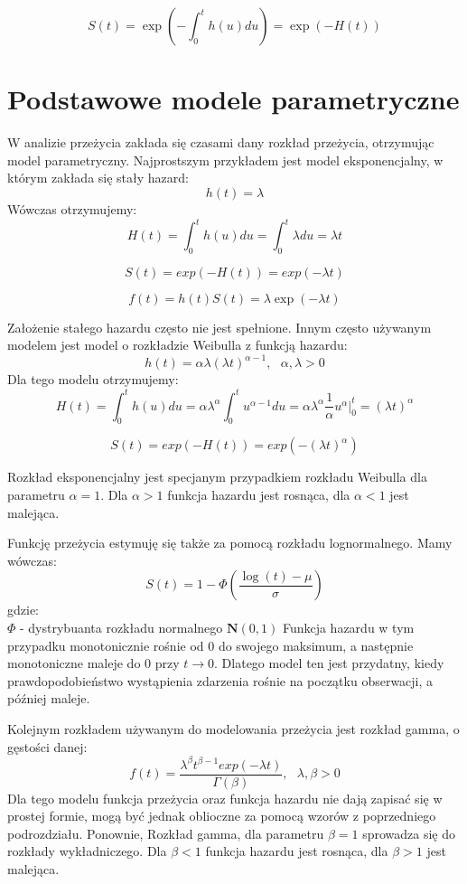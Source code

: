 \documentclass[]{pracamgr}
\begin{document}
\begin{equation}
S(t) = \exp(-\int_0^t h(u)du) = \exp(-H(t))
\end{equation}

\section{Podstawowe modele parametryczne}
W analizie przeżycia zakłada się czasami dany rozkład przeżycia, otrzymując model parametryczny. Najprostszym przykładem jest model eksponencjalny, w którym zakłada się stały hazard:
\begin{equation}\label{exp_hazard}
h(t) = \lambda
\end{equation}
Wówczas otrzymujemy:
$$H(t) = \int_0^t h(u)du = \int_0^t \lambda du = \lambda t $$

$$S(t) = exp(-H(t)) = exp(-\lambda t)$$

$$f(t) = h(t)S(t) = \lambda \exp(-\lambda t) $$

Założenie stałego hazardu często nie jest spełnione. Innym często używanym modelem jest model o rozkładzie Weibulla z funkcją hazardu:
\begin{equation}\label{weibull_haz}
h(t) = \alpha \lambda (\lambda t)^{\alpha -1}, \ \ \ \alpha, \lambda > 0
\end{equation}
Dla tego modelu otrzymujemy:
$$H(t) = \int_0^t h(u)du = \alpha \lambda^\alpha \int_0^t u^{\alpha - 1}du = \alpha \lambda^\alpha \frac{1}{\alpha} u^{\alpha}|_0^t = (\lambda t)^\alpha $$

$$S(t) = exp(-H(t)) = exp(-(\lambda t)^\alpha)$$

Rozkład eksponencjalny jest specjanym przypadkiem rozkładu Weibulla dla parametru $\alpha=1$. Dla $\alpha >1$ funkcja hazardu jest rosnąca, dla $\alpha <1$ jest malejąca.

Funkcję przeżycia estymuję się także za pomocą rozkładu lognormalnego. Mamy wówczas:
\begin{equation}\label{lognorm}
S(t) = 1 - \Phi (\frac{\log(t)-\mu}{\sigma})
\end{equation}
gdzie: \\
$\Phi$ - dystrybuanta rozkładu normalnego $\mathbf{N}(0,1)$
Funkcja hazardu w tym przypadku monotonicznie rośnie od $0$ do swojego maksimum, a następnie monotoniczne maleje do $0$ przy $t \to 0$. Dlatego model ten jest przydatny, kiedy prawdopodobieństwo wystąpienia zdarzenia rośnie na początku obserwacji, a później maleje.

Kolejnym rozkładem używanym do modelowania przeżycia jest rozkład gamma, o gęstości danej:
\begin{equation}\label{gamma}
f(t) = \frac{\lambda^\beta t^{\beta - 1} exp(-\lambda t)}{\Gamma(\beta)}, \ \ \ \lambda, \beta > 0
\end{equation}
Dla tego modelu funkcja przeżycia oraz funkcja hazardu nie dają zapisać się w prostej formie, mogą być jednak oblioczne za pomocą wzorów z poprzedniego podrozdziału. Ponownie, Rozkład gamma, dla parametru $\beta = 1$ sprowadza się do rozkłady wykładniczego. Dla $\beta < 1$ funkcja hazardu jest rosnąca, dla $\beta > 1$ jest malejąca.
\end{document}
